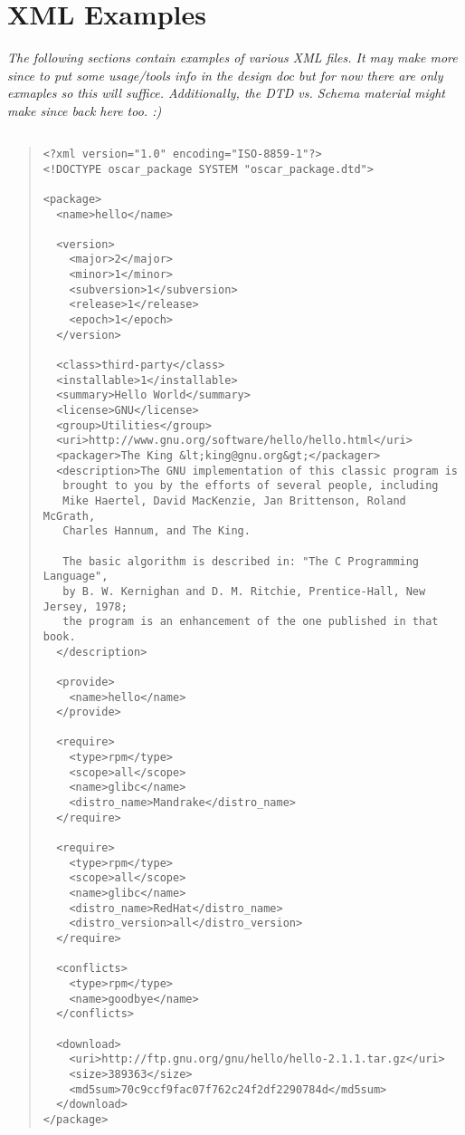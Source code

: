 %
%
%

\section{XML Examples}
\label{append:xml-overview}
\emph{The following sections contain examples of various XML files.  
It may make more since to put some usage/tools info in the design doc 
but for now there are only exmaples so this will suffice.
Additionally, the DTD vs. Schema material might make since back here
too.  :)}

\subsection{}
\begin{quote}
 \begin{small}
 \begin{verbatim}
<?xml version="1.0" encoding="ISO-8859-1"?>
<!DOCTYPE oscar_package SYSTEM "oscar_package.dtd">

<package>
  <name>hello</name>

  <version>
    <major>2</major>
    <minor>1</minor>
    <subversion>1</subversion>
    <release>1</release>
    <epoch>1</epoch>
  </version>

  <class>third-party</class>
  <installable>1</installable>
  <summary>Hello World</summary>
  <license>GNU</license>
  <group>Utilities</group>
  <uri>http://www.gnu.org/software/hello/hello.html</uri>
  <packager>The King &lt;king@gnu.org&gt;</packager>
  <description>The GNU implementation of this classic program is
   brought to you by the efforts of several people, including 
   Mike Haertel, David MacKenzie, Jan Brittenson, Roland McGrath, 
   Charles Hannum, and The King.

   The basic algorithm is described in: "The C Programming Language", 
   by B. W. Kernighan and D. M. Ritchie, Prentice-Hall, New Jersey, 1978;
   the program is an enhancement of the one published in that book.  
  </description>

  <provide>
    <name>hello</name>
  </provide>

  <require>
    <type>rpm</type>
    <scope>all</scope>
    <name>glibc</name>
    <distro_name>Mandrake</distro_name>
  </require>

  <require>
    <type>rpm</type>
    <scope>all</scope>
    <name>glibc</name>
    <distro_name>RedHat</distro_name>
    <distro_version>all</distro_version>
  </require>

  <conflicts>
    <type>rpm</type>
    <name>goodbye</name>
  </conflicts>

  <download>
    <uri>http://ftp.gnu.org/gnu/hello/hello-2.1.1.tar.gz</uri>
    <size>389363</size>
    <md5sum>70c9ccf9fac07f762c24f2df2290784d</md5sum>
  </download>
</package>
 \end{verbatim}
 \end{small}
\end{quote}

